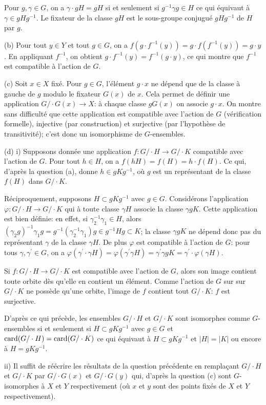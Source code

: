 {{\hskip 5mm Pour $g,\gamma\in G$, on a $\gamma\cdot gH = gH$ si et seulement si $g^{-1} \gamma g \in H$ ce qui \'equivaut \`a $\gamma \in gHg^{-1}$. Le fixateur de la classe $gH$ est le
sous-groupe conjugu\'e $gHg^{-1}$ de $H$ par $g$.
\medskip

(b) Pour tout $y\in Y$ et tout $g\in G$, on a $f(g\cdot f^{-1}(y)) = g\cdot f(f^{-1}(y)) =
g\cdot y$. En appliquant $f^{-1}$, on obtient $g\cdot f^{-1}(y)=f^{-1}(g\cdot y)$, ce qui
montre que $f^{-1}$ est compatible \`a l'action de $G$. 
\medskip

(c) Soit $x\in X$ fix\'e. Pour $g\in G$, l'\'el\'ement $g\cdot x$ ne d\'epend que de la classe
\`a gauche de $g$ modulo le fixateur $G(x)$ de $x$. Cela permet de d\'efinir une application
$G/\cdot G(x) \rightarrow X$: \`a chaque classe $gG(x)$ on associe $g\cdot x$. On montre
sans difficult\'e que cette application est compatible avec l'action de $G$ (v\'erification
formelle), injective (par construction) et surjective (par l'hypoth\`ese de transitivit\'e);
c'est donc un isomorphisme de $G$-ensembles.
\medskip

(d) i) Supposons donn\'ee une application $f:G/\cdot H\rightarrow G/\cdot K$
compatible avec l'action de $G$. Pour tout $h\in H$, on a $f(hH)=f(H)=h\cdot f(H)$. Ce qui,
d'apr\`es la question (a), donne $h\in gKg^{-1}$, o\`u $g$ est un repr\'esentant de la classe
$f(H)$ dans $G/\cdot K$.
\smallskip

\hskip 5mm R\'eciproquement, supposons $H\subset gKg^{-1}$ avec $g\in G$. Consid\'erons l'application
$\varphi: G/\cdot H \rightarrow G/\cdot K$ qui \`a toute classe $\gamma H$ associe la classe
$\gamma g K$. Cette application est bien d\'efinie: en effet, si $\gamma_2^{-1}\gamma_1\in H$,
alors $(\gamma_2g)^{-1} \gamma_1g = g^{-1}(\gamma_2^{-1}\gamma_1)g \in g^{-1}Hg\subset K$;
la classe $\gamma g K$ ne d\'epend donc pas du repr\'esentant $\gamma$ de la classe $\gamma
H$. De plus $\varphi$ est compatible \`a l'action de $G$: pour tous $\gamma, \gamma^\prime \in
G$, on a $\varphi (\gamma^{\prime}\cdot\gamma H) = \varphi (\gamma^{\prime}\gamma H) =
\gamma^{\prime}\gamma gK = \gamma^{\prime}\cdot \varphi (\gamma H)$.
\smallskip

\hskip 5mm Si $f:G/\cdot H\rightarrow G/\cdot K$ est compatible avec l'action de $G$, alors son image
contient toute orbite d\`es qu'elle en contient un \'el\'ement. Comme l'action de $G$ sur sur
$G/\cdot K$ ne poss\`ede qu'une orbite, l'image de $f$ contient tout $G/\cdot K$: $f$ est
surjective.
\smallskip

\hskip 5mm D'apr\`es ce qui pr\'ec\`ede, les ensembles $G/\cdot H$ et $G/\cdot K$ sont isomorphes
comme $G$-ensembles si et seulement si $H\subset gKg^{-1}$ avec $g\in G$ et $\hbox{\rm
card}(G/\cdot H) = \hbox{\rm card}(G/\cdot K)$ ce qui \'equivaut \`a $H\subset gKg^{-1}$ et
$|H|=|K|$ ou encore \`a $H=gKg^{-1}$.
\smallskip

ii) Il suffit de r\'e\'ecrire les r\'esultats de la question pr\'ec\'edente en rempla\c cant
$G/\cdot H$ et $G/\cdot K$ par $G/\cdot G(x)$ et $G/\cdot G(y)$ qui, d'apr\`es la question (c)
sont $G$-isomorphes \`a $X$ et $Y$ respectivement (o\`u $x$ et $y$ sont des points fix\'es de
$X$ et $Y$ respectivement).
}
}
